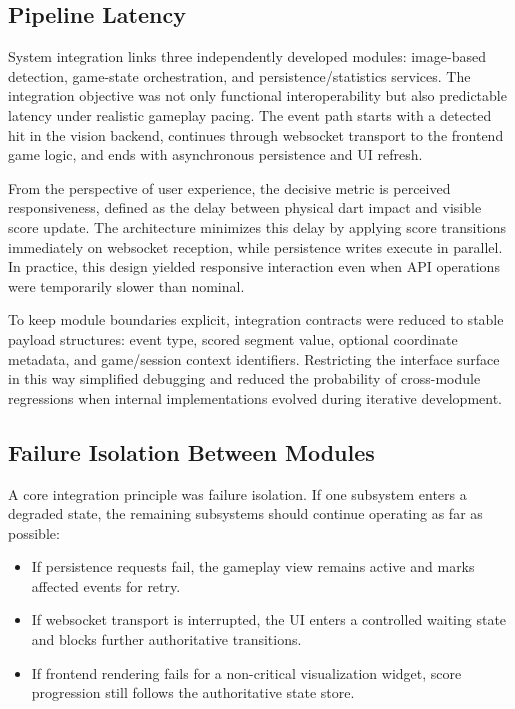 \subsection{Pipeline Latency}

System integration links three independently developed modules: image-based detection, game-state orchestration, and persistence/statistics services. The integration objective was not only functional interoperability but also predictable latency under realistic gameplay pacing. The event path starts with a detected hit in the vision backend, continues through websocket transport to the frontend game logic, and ends with asynchronous persistence and UI refresh.

From the perspective of user experience, the decisive metric is perceived responsiveness, defined as the delay between physical dart impact and visible score update. The architecture minimizes this delay by applying score transitions immediately on websocket reception, while persistence writes execute in parallel. In practice, this design yielded responsive interaction even when API operations were temporarily slower than nominal.

To keep module boundaries explicit, integration contracts were reduced to stable payload structures: event type, scored segment value, optional coordinate metadata, and game/session context identifiers. Restricting the interface surface in this way simplified debugging and reduced the probability of cross-module regressions when internal implementations evolved during iterative development.

\subsection{Failure Isolation Between Modules}
A core integration principle was failure isolation. If one subsystem enters a degraded state, the remaining subsystems should continue operating as far as possible:
\begin{itemize}
  \item If persistence requests fail, the gameplay view remains active and marks affected events for retry.
  \item If websocket transport is interrupted, the UI enters a controlled waiting state and blocks further authoritative transitions.
  \item If frontend rendering fails for a non-critical visualization widget, score progression still follows the authoritative state store.
\end{itemize}

